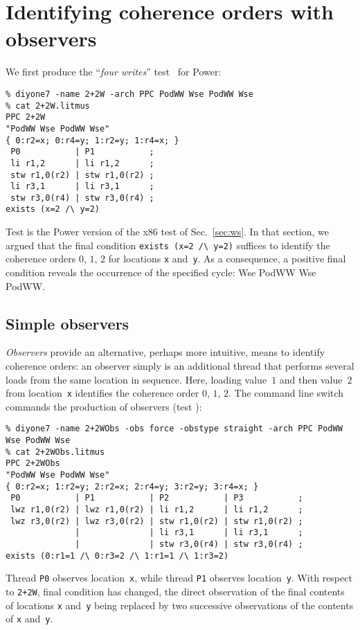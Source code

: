 \section{Identifying\label{observers} coherence orders with observers}
We first produce the ``\emph{four writes}'' test~
for Power:
\begin{verbatim}
% diyone7 -name 2+2W -arch PPC PodWW Wse PodWW Wse
% cat 2+2W.litmus
PPC 2+2W
"PodWW Wse PodWW Wse"
{ 0:r2=x; 0:r4=y; 1:r2=y; 1:r4=x; }
 P0           | P1           ;
 li r1,2      | li r1,2      ;
 stw r1,0(r2) | stw r1,0(r2) ;
 li r3,1      | li r3,1      ;
 stw r3,0(r4) | stw r3,0(r4) ;
exists (x=2 /\ y=2)
\end{verbatim}
Test  is the Power version of the x86 test
 of Sec.~\ref{sec:ws}.
In that section, we argued that the final condition \verb+exists (x=2 /\ y=2)+
suffices to identify the coherence orders $0$, $1$, $2$
for locations \texttt{x} and~\texttt{y}.
As a consequence, a positive final condition reveals the occurrence
of the specified cycle: Wse PodWW Wse PodWW.

\subsection{Simple observers}
\emph{Observers} provide an alternative, perhaps more intuitive,
means to identify coherence orders: an observer simply is an additional thread
that performs several loads from the same location in sequence.
Here, loading value~$1$ and then value~$2$ from location~\texttt{x}
identifies the coherence order  $0$, $1$, $2$.
The command line switch  commands the production
of observers (test ):
\begin{verbatim}
% diyone7 -name 2+2WObs -obs force -obstype straight -arch PPC PodWW Wse PodWW Wse
% cat 2+2WObs.litmus
PPC 2+2WObs
"PodWW Wse PodWW Wse"
{ 0:r2=x; 1:r2=y; 2:r2=x; 2:r4=y; 3:r2=y; 3:r4=x; }
 P0           | P1           | P2           | P3           ;
 lwz r1,0(r2) | lwz r1,0(r2) | li r1,2      | li r1,2      ;
 lwz r3,0(r2) | lwz r3,0(r2) | stw r1,0(r2) | stw r1,0(r2) ;
              |              | li r3,1      | li r3,1      ;
              |              | stw r3,0(r4) | stw r3,0(r4) ;
exists (0:r1=1 /\ 0:r3=2 /\ 1:r1=1 /\ 1:r3=2)
\end{verbatim}
Thread \texttt{P0} observes location~\texttt{x}, while
thread \texttt{P1} observes location~\texttt{y}.
With respect to \texttt{2+2W}, final condition has changed, the direct
observation of the final contents of locations \texttt{x} and~\texttt{y}
being replaced by two successive observations of the contents of
\texttt{x} and~\texttt{y}.


